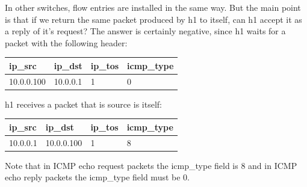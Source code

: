 \documentclass[10pt, journal, letterpaper]{IEEEtran}
\begin{document}

In other switches, flow entries are installed in the same way. But the main point is that if we return the same packet produced by h1 to itself, can h1 accept it as a reply of it's request? The answer is certainly negative, since h1 waits for a packet with the following header:
\begin{table}[ht]
\centering
\begin{tabular}{|l|l|l|l|}
\hline
ip\_src  & ip\_dst    & ip\_tos & icmp\_type   \\ 
\hline
10.0.0.100 & 10.0.0.1 & 1       & 0  \\
\hline
\end{tabular}
\end{table}

h1 receives a packet that is source is itself:
\begin{table}[ht]
\centering
\begin{tabular}{|l|l|l|l|}
\hline
ip\_src  & ip\_dst    & ip\_tos & icmp\_type   \\ \hline
10.0.0.1 & 10.0.0.100 & 1       & 8 \\ \hline
\end{tabular}
\end{table}

Note that in ICMP echo request packets the icmp\_type field is 8 and in ICMP echo reply packets the icmp\_type field must be 0.
\end{document}
